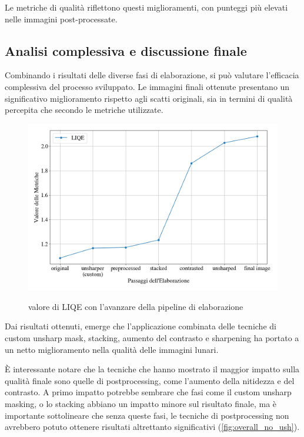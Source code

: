Le metriche di qualità riflettono questi miglioramenti, con punteggi più elevati nelle immagini post-processate.

\subsection{Analisi complessiva e discussione finale}

Combinando i risultati delle diverse fasi di elaborazione, si può valutare l'efficacia complessiva del processo sviluppato. Le immagini finali ottenute presentano un significativo miglioramento rispetto agli scatti originali, sia in termini di qualità percepita che secondo le metriche utilizzate.

\begin{figure}[H]
    \centering
    \caption{valore di LIQE con l'avanzare della pipeline di elaborazione}
    \includegraphics[width=\linewidth]{../assets/overall.png}
    \label{fig:overall}
\end{figure}

Dai risultati ottenuti, emerge che l'applicazione combinata delle tecniche di custom unsharp mask, stacking, aumento del contrasto e sharpening ha portato a un netto miglioramento nella qualità delle immagini lunari. 

È interessante notare che la tecniche che hanno mostrato il maggior impatto sulla qualità finale sono quelle di postprocessing, come l'aumento della nitidezza e del contrasto. A primo impatto potrebbe sembrare che fasi come il custom unsharp masking, o lo stacking abbiano un impatto minore sul risultato finale, ma è importante sottolineare che senza queste fasi, le tecniche di postprocessing non avrebbero potuto ottenere risultati altrettanto significativi (\cref{fig:overall_no_ush}).

